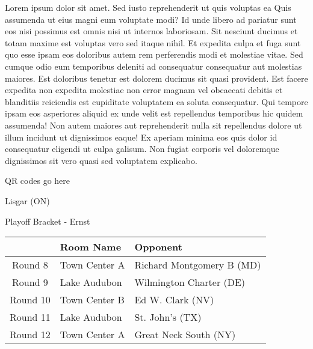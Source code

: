 \documentclass{article}%
\begin{document}
\vspace*{8pt}%
\linebreak%
\newline%
\newline%
Lorem ipsum dolor sit amet. Sed iusto reprehenderit ut quis voluptas ea Quis assumenda ut eius magni eum voluptate modi? Id unde libero ad pariatur sunt eos nisi possimus est omnis nisi ut internos laboriosam. Sit nesciunt ducimus et totam maxime est voluptas vero sed itaque nihil. Et expedita culpa et fuga sunt quo esse ipsam eos doloribus autem rem perferendis modi et molestiae vitae.\newline%
\newline%
Sed cumque odio eum temporibus deleniti ad consequatur consequatur aut molestias maiores. Est doloribus tenetur est dolorem ducimus sit quasi provident. Est facere expedita non expedita molestiae non error magnam vel obcaecati debitis et blanditiis reiciendis est cupiditate voluptatem ea soluta consequatur. Qui tempore ipsam eos asperiores aliquid ex unde velit est repellendus temporibus hic quidem assumenda!\newline%
\newline%
Non autem maiores aut reprehenderit nulla sit repellendus dolore ut illum incidunt ut dignissimos eaque! Ex aperiam minima eos quis dolor id consequatur eligendi ut culpa galisum. Non fugiat corporis vel doloremque dignissimos sit vero quasi sed voluptatem explicabo.\newline%
\newline%
%
\vspace*{30pt}%
\begin{center}%
\begin{Huge}%
QR codes go here%
\end{Huge}%
\end{center}%
\newpage%
\begin{center}%
\begin{Huge}%
Lisgar (ON)%
\end{Huge}%
\vspace*{8pt}%
\linebreak%
\begin{Large}%
Playoff Bracket {-} Ernst%
\end{Large}%
\end{center}%
%
\begin{tabularx}{\textwidth}{|c|Y|Y|}%
\hline%
&Room Name&Opponent\\%
\hline%
Round 8&Town Center A&Richard Montgomery B (MD)\\%
Round 9&Lake Audubon&Wilmington Charter (DE)\\%
Round 10&Town Center B&Ed W. Clark (NV)\\%
Round 11&Lake Audubon&St. John's (TX)\\%
Round 12&Town Center A&Great Neck South (NY)\\%
\hline%
\end{tabularx}%
\end{document}
